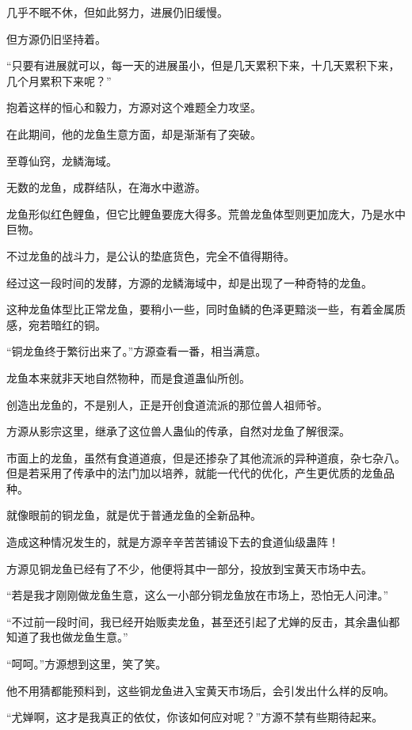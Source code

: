 \begin{this_body}
几乎不眠不休，但如此努力，进展仍旧缓慢。

但方源仍旧坚持着。

“只要有进展就可以，每一天的进展虽小，但是几天累积下来，十几天累积下来，几个月累积下来呢？”

抱着这样的恒心和毅力，方源对这个难题全力攻坚。

在此期间，他的龙鱼生意方面，却是渐渐有了突破。

至尊仙窍，龙鳞海域。

无数的龙鱼，成群结队，在海水中遨游。

龙鱼形似红色鲤鱼，但它比鲤鱼要庞大得多。荒兽龙鱼体型则更加庞大，乃是水中巨物。

不过龙鱼的战斗力，是公认的垫底货色，完全不值得期待。

经过这一段时间的发酵，方源的龙鳞海域中，却是出现了一种奇特的龙鱼。

这种龙鱼体型比正常龙鱼，要稍小一些，同时鱼鳞的色泽更黯淡一些，有着金属质感，宛若暗红的铜。

“铜龙鱼终于繁衍出来了。”方源查看一番，相当满意。

龙鱼本来就非天地自然物种，而是食道蛊仙所创。

创造出龙鱼的，不是别人，正是开创食道流派的那位兽人祖师爷。

方源从影宗这里，继承了这位兽人蛊仙的传承，自然对龙鱼了解很深。

市面上的龙鱼，虽然有食道道痕，但是还掺杂了其他流派的异种道痕，杂七杂八。但是若采用了传承中的法门加以培养，就能一代代的优化，产生更优质的龙鱼品种。

就像眼前的铜龙鱼，就是优于普通龙鱼的全新品种。

造成这种情况发生的，就是方源辛辛苦苦铺设下去的食道仙级蛊阵！

方源见铜龙鱼已经有了不少，他便将其中一部分，投放到宝黄天市场中去。

“若是我才刚刚做龙鱼生意，这么一小部分铜龙鱼放在市场上，恐怕无人问津。”

“不过前一段时间，我已经开始贩卖龙鱼，甚至还引起了尤婵的反击，其余蛊仙都知道了我也做龙鱼生意。”

“呵呵。”方源想到这里，笑了笑。

他不用猜都能预料到，这些铜龙鱼进入宝黄天市场后，会引发出什么样的反响。

“尤婵啊，这才是我真正的依仗，你该如何应对呢？”方源不禁有些期待起来。

\end{this_body}

